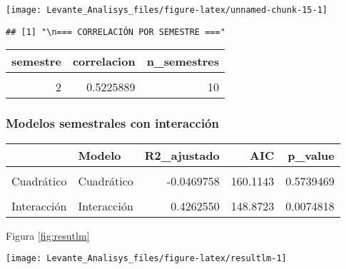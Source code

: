 \documentclass[
]{article}
\begin{document}
\begin{center}\texttt{[image: Levante\_Analisys\_files/figure-latex/unnamed-chunk-15-1]} \end{center}

\begin{verbatim}
## [1] "\n=== CORRELACIÓN POR SEMESTRE ==="
\end{verbatim}

\begin{table}[!h]
\centering
\begin{tabular}[t]{r|r|r}
\hline
semestre & correlacion & n\_semestres\\
\hline
\cellcolor{gray!10}{1} & \cellcolor{gray!10}{-0.1966243} & \cellcolor{gray!10}{10}\\
\hline
2 & 0.5225889 & 10\\
\hline
\end{tabular}
\end{table}

\subsubsection{Modelos semestrales con interacción}\label{modelos-semestrales-con-interacciuxf3n}

\begin{table}[!h]
\centering
\begin{tabular}[t]{l|l|r|r|r}
\hline
  & Modelo & R2\_ajustado & AIC & p\_value\\
\hline
\cellcolor{gray!10}{Lineal} & \cellcolor{gray!10}{Lineal} & \cellcolor{gray!10}{-0.0554818} & \cellcolor{gray!10}{159.4193} & \cellcolor{gray!10}{0.9720995}\\
\hline
Cuadrático & Cuadrático & -0.0469758 & 160.1143 & 0.5739469\\
\hline
\cellcolor{gray!10}{Con semestre} & \cellcolor{gray!10}{Con semestre} & \cellcolor{gray!10}{0.3456430} & \cellcolor{gray!10}{150.7142} & \cellcolor{gray!10}{0.0105642}\\
\hline
Interacción & Interacción & 0.4262550 & 148.8723 & 0.0074818\\
\hline
\end{tabular}
\end{table}

Figura \ref{fig:resutlm}

\begin{center}\texttt{[image: Levante\_Analisys\_files/figure-latex/resultlm-1]} \end{center}
\end{document}
